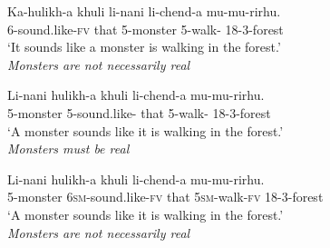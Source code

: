\documentclass[output=paper,colorlinks,citecolor=brown
]{langscibook}
\begin{document}
\begin{xlist}

\ex\label{ex:johnson:MonsterSoundsLikeUnraised} 
\gll Ka-hulikh-a khuli li-nani li-chend-a mu-mu-rirhu.\\
6\Sm-sound.like-\textsc{fv} that 5-monster 5\Sm-walk-\Fv{} 18-3-forest\\ 
\glt `It sounds like a monster is walking in the forest.'\\
\textit{Monsters are not necessarily real}

\ex\label{ex:johnson:MonsterSoundsLikeAgrRaising} 
\gll Li-nani hulikh-a khuli li-chend-a mu-mu-rirhu.\\
5-monster 5\Sm-sound.like-\Fv{} that 5\Sm-walk-\Fv{} 18-3-forest \\ 
\glt `A monster sounds like it is walking in the forest.' \\
\textit{Monsters must be real}

\ex\label{ex:johnson:MonsterSoundsLikeNonAgrRaising} %

\gll Li-nani hulikh-a khuli li-chend-a mu-mu-rirhu.\\
5-monster 6\textsc{sm}-sound.like-\textsc{fv} that 5\textsc{sm}-walk-\textsc{fv} 18-3-forest\\ 
\glt `A monster sounds like it is walking in the forest.'\\
\textit{Monsters are not necessarily real}

\end{xlist}
\z
\end{document}
